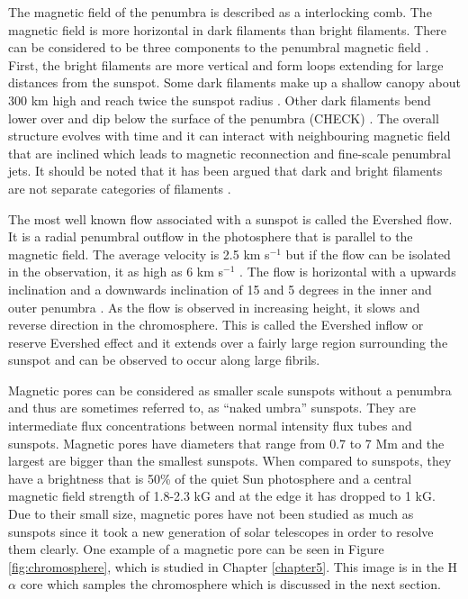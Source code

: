 	The magnetic field of the penumbra is described as a interlocking comb.
	The magnetic field is more horizontal in dark filaments than bright filaments.
	There can be considered to be three components to the penumbral magnetic field \citep{2005A&A...436.1087L}.
	First, the bright filaments are more vertical and form loops extending for large distances from the sunspot.
	Some dark filaments make up a shallow canopy about 300 km high and reach twice the sunspot radius \cite{1991A&A...252..821D}.
	Other dark filaments bend lower over and dip below the surface of the penumbra (CHECK) \citep{1993ApJ...403..780T}.
	The overall structure evolves with time and it can interact with neighbouring magnetic field that are inclined which leads to magnetic reconnection and fine-scale penumbral jets.
	It should be noted that it has been argued that dark and bright filaments are not separate categories of filaments \citep{2013A&A...557A..25T}.
	
	The most well known flow associated with a sunspot is called the Evershed flow.
	It is a radial penumbral outflow in the photosphere that is parallel to the magnetic field.
	The average velocity is 2.5 km s$^{-1}$ but if the flow can be isolated in the observation, it as high as 6 km s$^{-1}$ \citep{2003A&A...403L..47B}.
	The flow is horizontal with a upwards inclination and a downwards inclination of 15 and 5 degrees in the inner and outer penumbra \citep{2004A&A...415..717T}.
	As the flow is observed in increasing height, it slows and reverse direction in the chromosphere.
	This is called the Evershed inflow or reserve Evershed effect and it extends over a fairly large region surrounding the sunspot and can be observed to occur along large fibrils.
	
    Magnetic pores can be considered as smaller scale sunspots without a penumbra and thus are sometimes referred to, as ``naked umbra'' sunspots.
    They are intermediate flux concentrations between normal intensity flux tubes and sunspots.
	Magnetic pores have diameters that range from 0.7 to 7 Mm and the largest are bigger than the smallest sunspots.
	When compared to sunspots, they have a brightness that is 50\% of the quiet Sun photosphere and a central magnetic field strength of 1.8-2.3 kG and at the edge it has dropped to 1 kG.
    Due to their small size, magnetic pores have not been studied as much as sunspots since it took a new generation of solar telescopes in order to resolve them clearly.
    One example of a magnetic pore can be seen in Figure \ref{fig:chromosphere}, which is studied in Chapter \ref{chapter5}.
    This image is in the H$\alpha$ core which samples the chromosphere which is discussed in the next section.

